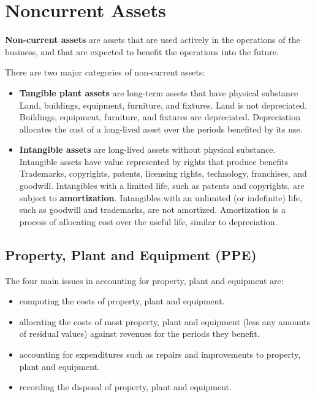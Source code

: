 \documentclass[../main.tex]{subfiles}
\begin{document}
	\section{Noncurrent Assets}
	
	\textbf{Non-current assets} are assets that are used actively in the 
	operations of the business, and that are expected to benefit the operations 
	into the future.
	
	There are two major categories of non-current assets:
	\begin{itemize}[noitemsep]
		\item \textbf{Tangible plant assets} are long-term assets that have 
		physical substance \eg Land, buildings, equipment, furniture, and 
		fixtures.  Land is not depreciated. Buildings, equipment, 
		furniture, and fixtures are depreciated. Depreciation allocates the 
		cost of a long-lived asset over the periods benefited by its use.
		\item \textbf{Intangible assets} are 
		long-lived assets without physical substance. Intangible assets have 
		value represented by rights that produce benefits \eg 
		Trademarks, copyrights, patents, licensing rights, technology, 
		franchises, and goodwill. Intangibles with a limited life, such as 
		patents and copyrights, are 
		subject to \textbf{amortization}. Intangibles with an unlimited (or 
		indefinite) life, such as goodwill and trademarks, are not amortized. 
		Amortization is a process of allocating cost over the useful life, 
		similar to depreciation.
	\end{itemize}
	
	\subsection{Property, Plant and Equipment (PPE)}
	The four main issues in accounting for  property, plant and equipment are:
	\begin{itemize}[noitemsep]
		\item computing the costs of  property, plant and equipment.
		\item allocating the costs of most  property, plant and equipment (less 
		any amounts of residual values) against revenues for the periods they 
		benefit.
		\item accounting for expenditures such as repairs and improvements to  
		property, plant and equipment.
		\item recording the disposal of property, plant and equipment.
	\end{itemize}
\end{document}
